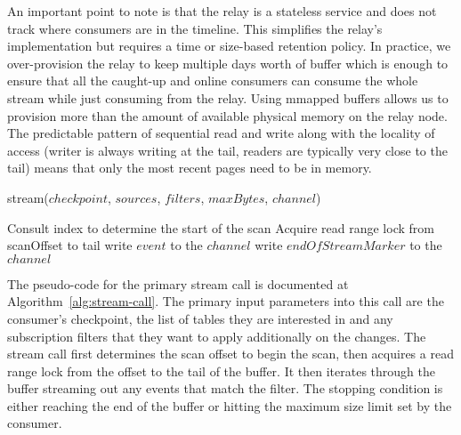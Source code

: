 An important point to note is that the relay is a stateless service and does not track where consumers are in the timeline. This simplifies the relay's implementation but requires a time or size-based retention policy. In practice, we over-provision the relay to keep multiple days worth of buffer which is enough to ensure that all the caught-up and online consumers can consume the whole stream while just consuming from the relay. Using mmapped buffers allows us to provision more than the amount of available physical memory on the relay node. The predictable pattern of sequential read and write along with the locality of access (writer is always writing at the tail, readers are typically very close to the tail) means that only the most recent pages need to be in memory.  

\begin{algorithm}
\label{alg:stream-call}{stream}{($checkpoint$, $sources$, $filters$, $maxBytes$, $channel$)}
\caption{Databus Relay Stream Algorithm}
\begin{algorithmic}
\STATE Consult index to determine the start of the scan
\STATE Acquire read range lock from scanOffset to tail
\STATE write $event$ to the $channel$
\ENDIF
\ENDFOR
\STATE write $endOfStreamMarker$ to the $channel$
\end{algorithmic}
\end{algorithm} 

The pseudo-code for the primary stream call is documented at Algorithm~\ref{alg:stream-call}. The primary input parameters into this call are the consumer's checkpoint, the list of tables they are interested in and any subscription filters that they want to apply additionally on the changes. The stream call first determines the scan offset to begin the scan, then acquires a read range lock from the offset to the tail of the buffer. It then iterates through the buffer streaming out any events that match the filter. The stopping condition is either reaching the end of the buffer or hitting the maximum size limit set by the consumer. 



